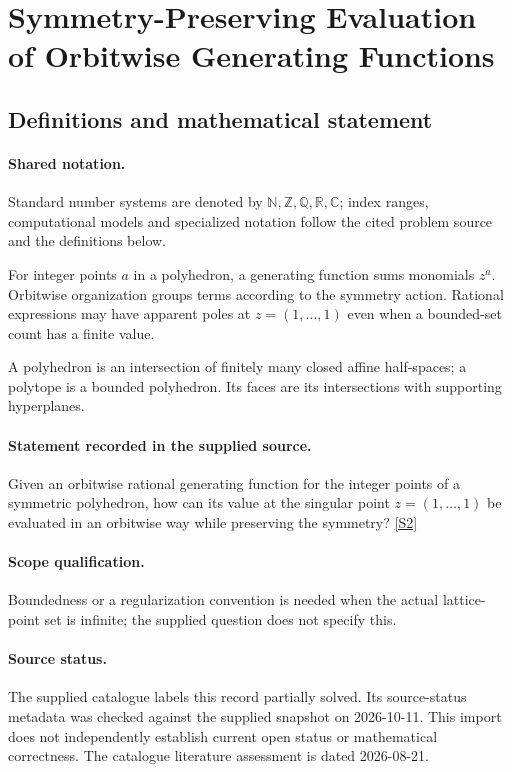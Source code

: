 \documentclass[11pt]{article}
\newcommand{\sref}[2]{\hyperlink{source:#1:#2}{[S#2]}}
\begin{document}
\section{Symmetry-Preserving Evaluation of Orbitwise Generating Functions}\label{statement}

\subsection{Definitions and mathematical statement}

\paragraph{Shared notation.}Standard number systems are denoted by $\mathbb N,\mathbb Z,\mathbb Q,\mathbb R,\mathbb C$; index ranges, computational models and specialized notation follow the cited problem source and the definitions below.


For integer points $a$ in a polyhedron, a generating function sums monomials $z^a$. Orbitwise organization groups terms according to the symmetry action. Rational expressions may have apparent poles at $z=(1,\ldots,1)$ even when a bounded-set count has a finite value.

A polyhedron is an intersection of finitely many closed affine half-spaces; a polytope is a bounded polyhedron. Its faces are its intersections with supporting hyperplanes.
\paragraph{Statement recorded in the supplied source.}
Given an orbitwise rational generating function for the integer points of a symmetric polyhedron, how can its value at the singular point $z=(1,\ldots,1)$ be evaluated in an orbitwise way while preserving the symmetry? \sref{statement}{2}
\paragraph{Scope qualification.}
Boundedness or a regularization convention is needed when the actual lattice-point set is infinite; the supplied question does not specify this.
\paragraph{Source status.}
The supplied catalogue labels this record partially solved. Its source-status metadata was checked against the supplied snapshot on 2026-10-11. This import does not independently establish current open status or mathematical correctness. The catalogue literature assessment is dated 2026-08-21.
\end{document}
